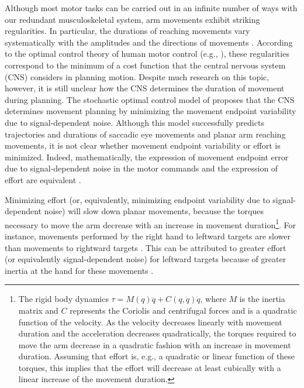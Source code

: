 Although most motor tasks can be carried out in an infinite number of ways with our redundant musculoskeletal system, arm movements exhibit striking regularities. 
In particular, the durations of reaching movements vary systematically with the amplitudes and the directions of movements \cite{Gordon1994}. 
According to the optimal control theory of human motor control (e.g., \cite{Flash1985, Hoff1994, Uno1989}), these regularities correspond to the minimum of a cost function that the central nervous system (CNS) considers in planning motion. Despite much research on this topic, however, it is still unclear how the CNS determines the duration of movement during planning. The stochastic optimal control model of \cite{Harris1998} proposes that the CNS determines movement planning by minimizing the movement endpoint variability due to signal-dependent noise. Although this model successfully predicts trajectories and durations of saccadic eye movements and planar arm reaching movements, it is not clear whether movement endpoint variability or effort is minimized. Indeed, mathematically, the expression of movement endpoint error due to signal-dependent noise in the motor commands and the expression of effort are equivalent \cite{OSullivan2009}.

Minimizing effort (or, equivalently, minimizing endpoint variability due to signal-dependent noise) will slow down planar movements, because the torques necessary to move the arm decrease with an increase in movement duration\footnote{The rigid body dynamics $\tau = M(q)\ddot{q} + C(q,\dot{q})\dot{q}$, where $M$ is the inertia matrix and $C$ represents the Coriolis and centrifugal forces and is a quadratic function of the velocity. As the velocity decreases linearly with movement duration and the acceleration decreases quadratically, the torques required to move the arm decrease in a quadratic fashion with an increase in movement duration. Assuming that effort is, e.g., a quadratic or linear function of these torques, this implies that the effort will decrease at least cubically \cite{Shadmehr2016} with a linear increase of the movement duration.}. 
For instance, movements performed by the right hand to leftward targets are slower than movements to rightward targets \cite{Gordon1994,Park2016}. This can be attributed to greater effort (or equivalently signal-dependent noise) for leftward targets because of greater inertia at the hand for these movements \cite{Cos2011, Guigon2007, Schweighofer2015}. 


